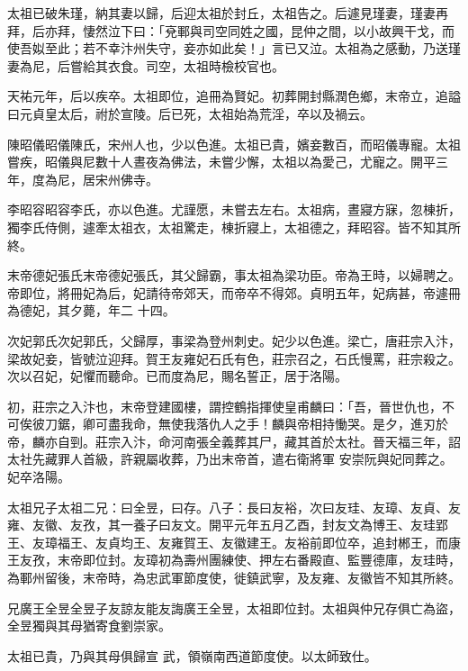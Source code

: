 \begin{pinyinscope}
 太祖已破朱瑾，納其妻以歸，后迎太祖於封丘，太祖告之。后遽見瑾妻，瑾妻再拜，后亦拜，悽然泣下曰：「兗鄆與司空同姓之國，昆仲之間，以小故興干戈，而使吾姒至此；若不幸汴州失守，妾亦如此矣！」言已又泣。太祖為之感動，乃送瑾妻為尼，后嘗給其衣食。司空，太祖時檢校官也。



 天祐元年，后以疾卒。太祖即位，追冊為賢妃。初葬開封縣潤色鄉，末帝立，追謚曰元貞皇太后，祔於宣陵。后已死，太祖始為荒淫，卒以及禍云。



 陳昭儀昭儀陳氏，宋州人也，少以色進。太祖已貴，嬪妾數百，而昭儀專寵。太祖嘗疾，昭儀與尼數十人晝夜為佛法，未嘗少懈，太祖以為愛己，尤寵之。開平三年，度為尼，居宋州佛寺。



 李昭容昭容李氏，亦以色進。尤謹愿，未嘗去左右。太祖病，晝寢方寐，忽棟折，獨李氏侍側，遽牽太祖衣，太祖驚走，棟折寢上，太祖德之，拜昭容。皆不知其所終。



 末帝德妃張氏末帝德妃張氏，其父歸霸，事太祖為梁功臣。帝為王時，以婦聘之。帝即位，將冊妃為后，妃請待帝郊天，而帝卒不得郊。貞明五年，妃病甚，帝遽冊為德妃，其夕薨，年二
 十四。



 次妃郭氏次妃郭氏，父歸厚，事梁為登州刺史。妃少以色進。梁亡，唐莊宗入汴，梁故妃妾，皆號泣迎拜。賀王友雍妃石氏有色，莊宗召之，石氏慢罵，莊宗殺之。次以召妃，妃懼而聽命。已而度為尼，賜名誓正，居于洛陽。



 初，莊宗之入汴也，末帝登建國樓，謂控鶴指揮使皇甫麟曰：「吾，晉世仇也，不可俟彼刀鋸，卿可盡我命，無使我落仇人之手！麟與帝相持慟哭。是夕，進刃於帝，麟亦自剄。莊宗入汴，命河南張全義葬其尸，藏其首於太社。晉天福三年，詔太社先藏罪人首級，許親屬收葬，乃出末帝首，遣右衛將軍
 安崇阮與妃同葬之。妃卒洛陽。



 太祖兄子太祖二兄：曰全昱，曰存。八子：長曰友裕，次曰友珪、友璋、友貞、友雍、友徽、友孜，其一養子曰友文。開平元年五月乙酉，封友文為博王、友珪郢王、友璋福王、友貞均王、友雍賀王、友徽建王。友裕前即位卒，追封郴王，而康王友孜，末帝即位封。友璋初為壽州團練使、押左右番殿直、監豐德庫，友珪時，為鄆州留後，末帝時，為忠武軍節度使，徙鎮武寧，及友雍、友徽皆不知其所終。



 兄廣王全昱全昱子友諒友能友誨廣王全昱，太祖即位封。太祖與仲兄存俱亡為盜，全昱獨與其母猶寄食劉崇家。



 太祖已貴，乃與其母俱歸宣
 武，領嶺南西道節度使。以太師致仕。




\end{pinyinscope}
